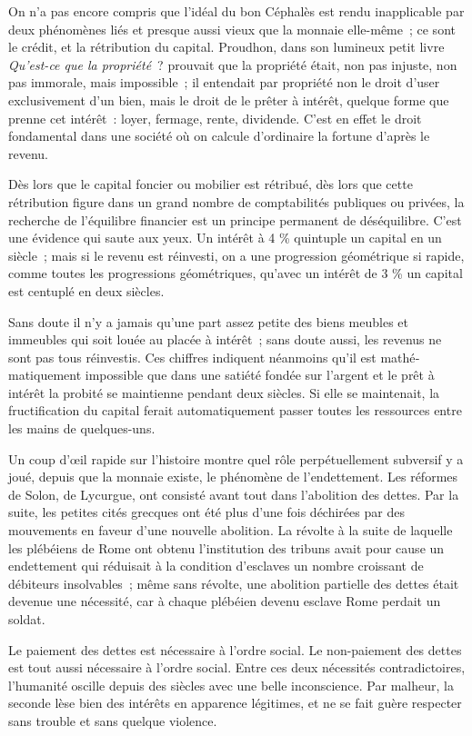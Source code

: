 \documentclass[french,twoside]{book} %
\begin{document}
On n'a pas encore compris que l'idéal du bon Céphalès est rendu inapplicable par deux phénomènes liés et presque aussi vieux que la monnaie elle-même ; ce sont le crédit, et la rétribution du capital. Proudhon, dans son lumineux petit livre {\itshape Qu'est-ce que la propriété} ? prouvait que la propriété était, non pas injuste, non pas immorale, mais impossible ; il entendait par propriété non le droit d'user exclusivement d'un bien, mais le droit de le prêter à intérêt, quelque forme que prenne cet intérêt : loyer, fermage, rente, dividende. C'est en effet le droit fondamental dans une société où on calcule d'ordinaire la fortune d'après le revenu.\par
Dès lors que le capital foncier ou mobilier est rétribué, dès lors que cette rétribution figure dans un grand nombre de comptabilités publiques ou privées, la recherche de l'équilibre financier est un principe permanent de déséquilibre. C'est une évidence qui saute aux yeux. Un intérêt à 4 \% quin­tuple un capital en un siècle ; mais si le revenu est réinvesti, on a une progression géométrique si rapide, comme toutes les progressions géomé­triques, qu'avec un intérêt de 3 \% un capital est centuplé en deux siècles.\par
Sans doute il n'y a jamais qu'une part assez petite des biens meubles et immeubles qui soit louée au placée à intérêt ; sans doute aussi, les revenus ne sont pas tous réinvestis. Ces chiffres indiquent néanmoins qu'il est mathé­matiquement impossible que dans une satiété fondée sur l'argent et le prêt à intérêt la probité se maintienne pendant deux siècles. Si elle se maintenait, la fructification du capital ferait automatiquement passer toutes les ressources entre les mains de quelques-uns.\par
Un coup d'œil rapide sur l'histoire montre quel rôle perpétuellement subversif y a joué, depuis que la monnaie existe, le phénomène de l’endette­ment. Les réformes de Solon, de Lycurgue, ont consisté avant tout dans l'abolition des dettes. Par la suite, les petites cités grecques ont été plus d'une fois déchirées par des mouvements en faveur d'une nouvelle abolition. La révolte à la suite de laquelle les plébéiens de Rome ont obtenu l'institution des tribuns avait pour cause un endettement qui réduisait à la condition d'esclaves un nombre croissant de débiteurs insolvables ; même sans révolte, une abolition partielle des dettes était devenue une nécessité, car à chaque plébéien devenu esclave Rome perdait un soldat.\par
Le paiement des dettes est nécessaire à l'ordre social. Le non-paiement des dettes est tout aussi nécessaire à l'ordre social. Entre ces deux nécessités con­tradictoires, l'humanité oscille depuis des siècles avec une belle inconscience. Par malheur, la seconde lèse bien des intérêts en apparence légitimes, et ne se fait guère respecter sans trouble et sans quelque violence.\par
\end{document}
